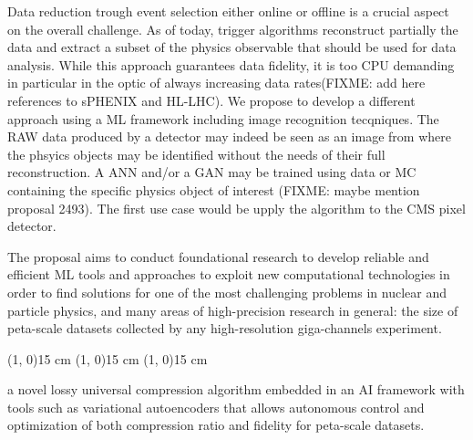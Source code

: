 Data reduction trough event selection either online or offline is a crucial aspect on the overall challenge. As of today, trigger algorithms reconstruct partially the data and extract a subset of the physics observable that should be used for data analysis. While this approach guarantees data fidelity, it is too CPU demanding in particular in the optic of always increasing data rates(FIXME: add here references to sPHENIX and HL-LHC). We propose to develop a different approach using a ML framework including image recognition tecqniques. The RAW data produced by a detector may indeed be seen as an image from where the phsyics objects may be identified without the needs of their full reconstruction. A ANN and/or a GAN may be trained using data or MC containing the specific physics object of interest (FIXME: maybe mention proposal 2493). The first use case would be upply the algorithm to the CMS pixel detector.
 


 

The proposal aims to conduct foundational research to develop reliable and efficient ML tools and approaches to exploit new computational technologies in order to find solutions for one of the most challenging problems in nuclear and particle physics, and many areas of high-precision research in general: the size of peta-scale datasets collected by any high-resolution giga-channels experiment. 
\clearpage





\line(1, 0){15 cm}
\line(1, 0){15 cm}
\line(1, 0){15 cm}

a novel lossy universal compression algorithm embedded in an AI framework with tools such as variational autoencoders that allows autonomous control and optimization of both compression ratio and fidelity for peta-scale datasets.

